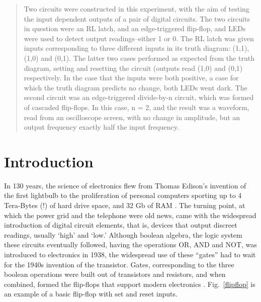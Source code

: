 \documentclass[aps,pre,twocolumn,nofootinbib]{revtex4}
\begin{document}
\title{}

\author{Gray Davidson}
\date{\today}

\begin{abstract}  
Two circuits were constructed in this experiment, with the aim of testing the input dependent outputs of a pair of digital circuits.  The two circuits in question were an RL latch, and an edge-triggered flip-flop, and LEDs were used to detect output readings--either 1 or 0.  The RL latch was given inputs corresponding to three different inputs in its truth diagram: (1,1), (1,0) and (0,1).  The latter two cases performed as expected from the truth diagram, setting and resetting the circuit (outputs read (1,0) and (0,1) respectively.  In the case that the inputs were both positive, a case for which the truth diagram predicts no change, both LEDs went dark.  The second circuit was an edge-triggered divide-by-n circuit, which was formed of cascaded flip-flops.  In this case, n = 2, and the result was a waveform, read from an oscilloscope screen, with no change in amplitude, but an output frequency exactly half the input frequency.  
\end{abstract}
\maketitle

\section{Introduction}

In 130 years, the science of electronics flew from Thomas Edison's invention of the first lightbulb to the proliferation of personal computers sporting up to 4 Tera-Bytes (!) of hard drive space, and 32 Gb of RAM \cite{apple}.  The turning point, at which the power grid and the telephone were old news, came with the widespread introduction of digital circuit elements, that is, devices that output discreet readings, usually `high' and `low.' Although boolean algebra, the logic system these circuits eventually followed, having the operations OR, AND and NOT, was introduced to electronics in 1938, the widespread use of these ``gates'' had to wait for the 1940s invention of the transistor.  Gates, corresponding to the three boolean operations were built out of transistors and resistors, and when combined, formed the flip-flops that support modern electronics \cite{simpson, krenz}.  Fig.~\ref{flipflop} is an example of a basic flip-flop with set and reset inputs.  
\end{document}
